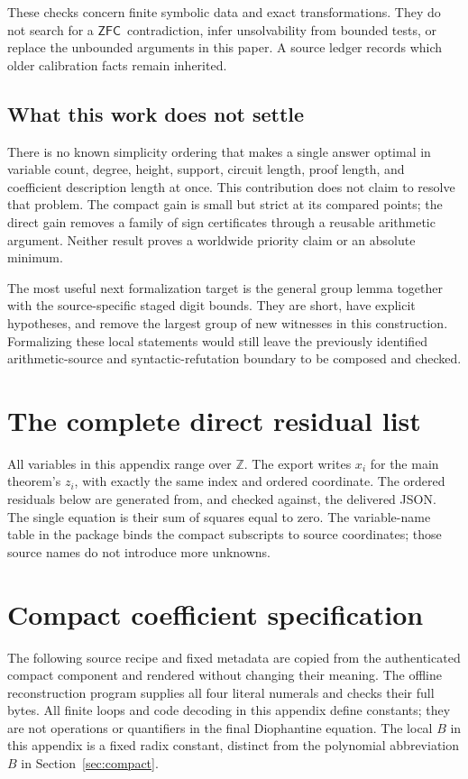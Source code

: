 \documentclass[11pt,letterpaper]{article}
\theoremstyle{definition}\newtheorem{definition}[theorem]{Definition}
\theoremstyle{remark}\newtheorem{remark}[theorem]{Remark}
\newcommand{\Z}{\ensuremath{\mathbb Z}}
\newcommand{\ZFC}{\ensuremath{\mathsf{ZFC}}}
\begin{document}
These checks concern finite symbolic data and exact transformations. They do not search for a \ZFC\ contradiction, infer unsolvability from bounded tests, or replace the unbounded arguments in this paper. A source ledger records which older calibration facts remain inherited.

\subsection{What this work does not settle}
There is no known simplicity ordering that makes a single answer optimal in variable count, degree, height, support, circuit length, proof length, and coefficient description length at once. This contribution does not claim to resolve that problem. The compact gain is small but strict at its compared points; the direct gain removes a family of sign certificates through a reusable arithmetic argument. Neither result proves a worldwide priority claim or an absolute minimum.

The most useful next formalization target is the general group lemma together with the source-specific staged digit bounds. They are short, have explicit hypotheses, and remove the largest group of new witnesses in this construction. Formalizing these local statements would still leave the previously identified arithmetic-source and syntactic-refutation boundary to be composed and checked.

\appendix
\section{The complete direct residual list}\label{app:residuals}
All variables in this appendix range over \Z. The export writes \(x_i\) for the main theorem's \(z_i\), with exactly the same index and ordered coordinate. The ordered residuals below are generated from, and checked against, the delivered JSON. The single equation is their sum of squares equal to zero. The variable-name table in the package binds the compact subscripts to source coordinates; those source names do not introduce more unknowns.


\section{Compact coefficient specification}\label{app:coefficients}
The following source recipe and fixed metadata are copied from the authenticated compact component and rendered without changing their meaning. The offline reconstruction program supplies all four literal numerals and checks their full bytes. All finite loops and code decoding in this appendix define constants; they are not operations or quantifiers in the final Diophantine equation. The local \(B\) in this appendix is a fixed radix constant, distinct from the polynomial abbreviation \(B\) in Section~\ref{sec:compact}.

\end{document}
